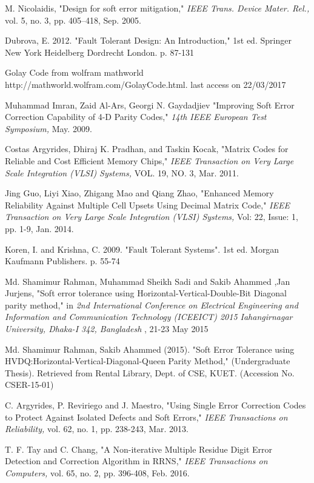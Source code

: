 \documentclass[12pt,a4paper]{report}
\begin{document}
\begin{thebibliography}{9}
M. Nicolaidis, "Design for soft error mitigation," \textit{IEEE Trans. Device Mater. Rel.,} vol. 5, no. 3, pp. 405–418, Sep. 2005.

Dubrova, E. 2012. "Fault Tolerant Design: An Introduction," 1st ed. Springer New York Heidelberg Dordrecht London. p. 87-131

Golay Code from wolfram mathworld http://mathworld.wolfram.com/GolayCode.html. last access on 22/03/2017

Muhammad Imran, Zaid Al-Ars, Georgi N.  Gaydadjiev "Improving Soft Error Correction Capability of 4-D Parity Codes," \textit{14th IEEE European Test Symposium,} May. 2009.

Costas Argyrides, Dhiraj K. Pradhan, and Taskin Kocak, "Matrix Codes for Reliable and Cost Efficient Memory Chips," \textit{IEEE Transaction on Very Large Scale Integration (VLSI) Systems,} VOL. 19, NO. 3, Mar. 2011.

Jing Guo, Liyi Xiao, Zhigang Mao and Qiang Zhao, "Enhanced Memory Reliability Against Multiple Cell Upsets Using Decimal Matrix Code," \textit{IEEE Transaction on Very Large Scale Integration (VLSI) Systems,} Vol: 22, Issue: 1, pp. 1-9, Jan. 2014.

Koren, I. and Krishna, C. 2009. "Fault Tolerant Systems". 1st ed. Morgan Kaufmann Publishers. p. 55-74

Md. Shamimur Rahman, Muhammad Sheikh Sadi and Sakib Ahammed ,Jan Jurjens, "Soft error tolerance using Horizontal-Vertical-Double-Bit Diagonal parity method," in \textit{2nd International Conference on Electrical Engineering and Information and Communication Technology (ICEEICT) 2015 Iahangirnagar University, Dhaka-I 342, Bangladesh }, 21-23 May 2015

Md. Shamimur Rahman, Sakib Ahammed (2015). "Soft Error Tolerance using HVDQ:Horizontal-Vertical-Diagonal-Queen Parity Method," (Undergraduate Thesis). Retrieved from Rental Library, Dept. of CSE, KUET. (Accession No. CSER-15-01)

C. Argyrides, P. Reviriego and J. Maestro, "Using Single Error Correction Codes to Protect Against Isolated Defects and Soft Errors," \textit{IEEE Transactions on Reliability,} vol. 62, no. 1, pp. 238-243, Mar. 2013.

T. F. Tay and C. Chang, "A Non-iterative Multiple Residue Digit Error Detection and Correction Algorithm in RRNS," \textit{IEEE Transactions on Computers,} vol. 65, no. 2, pp. 396-408, Feb. 2016.


\end{thebibliography}
\end{document}
